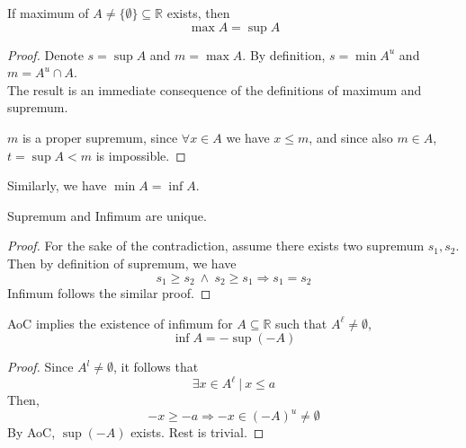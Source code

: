 \begin{proposition} If maximum of $A \neq \{ \emptyset \} \subseteq \mathbb{R}$ exists, then \[ \max A = \sup A\]
\begin{proof}
    Denote $s = \sup A$ and $m = \max A$. By definition, $s = \min A^u$ and $m = A^u \cap A$. \\
    The result is an immediate consequence of the definitions of maximum and supremum.

    \vspace{4mm}
    $m$ is a proper supremum, since $\forall x\in A$ we have $x \le m$, and since also $m \in A$, $t = \sup A < m$ is impossible.
\end{proof}
Similarly, we have $\min A = \inf A$.
\end{proposition}
\begin{proposition}
    Supremum and Infimum are unique.
    \begin{proof}
        For the sake of the contradiction, assume there exists two supremum $s_1, s_2$. Then by definition of supremum, we have 
        \[ s_1 \ge s_2 \ \land \ s_2 \ge s_1 \Rightarrow s_1 = s_2\]
        Infimum follows the similar proof.
    \end{proof}
\end{proposition}
\begin{proposition}
    AoC implies the existence of infimum for $A \subseteq \mathbb{R}$ such that $A^{\ell} \neq \emptyset$,
    \[\inf A = -\sup(-A)\]
    \begin{proof}
    Since $A^l \neq \emptyset$, it follows that
    \[\exists x \in A^{\ell} \ | \ x \le a\]
    Then,
    \[ -x \ge -a \Rightarrow -x \in (-A)^u \neq \emptyset \]
    By AoC, $\sup(-A)$ exists. Rest is trivial.

    \end{proof}
\end{proposition}
